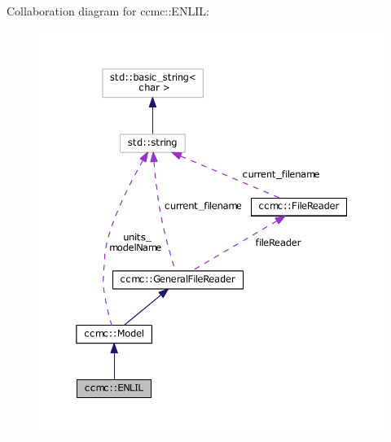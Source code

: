 Collaboration diagram for ccmc\-:\-:E\-N\-L\-I\-L\-:\nopagebreak
\begin{figure}[H]
\begin{center}
\leavevmode
\includegraphics[width=350pt]{classccmc_1_1_e_n_l_i_l__coll__graph}
\end{center}
\end{figure}
